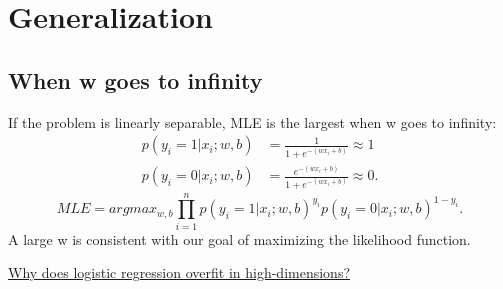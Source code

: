 \documentclass{report}
\begin{document}
  \chapter{Generalization}
  \section{When w goes to infinity}
  If the problem is linearly separable, MLE is the largest when w goes to infinity:
 \begin{align*}
	p\left( y_{i}=1 | x_{i} ; w,b \right) &= \frac{1}{1 + e^{-(wx_{i} + b)} } \approx 1 \\
	p( y_{i}=0 | x_{i} ; w,b ) &= \frac{e^{-(wx_{i}+b)}}{1 + e^{-(wx_{i} + b)}} \approx 0 
.\end{align*}
 \[
	 MLE = argmax_{w, b} \prod_{i=1}^{n}  p\left( y_{i}=1 | x_{i} ; w,b \right)^{y_{i}}p\left( y_{i}=0 | x_{i} ; w,b \right)^{1 - y_{i}}  
.\] 
A large w is consistent with our goal of maximizing the likelihood function.

 \href{http://eointravers.com/post/logistic-overfit/}{Why does logistic regression overfit in high-dimensions?
}
\end{document}
